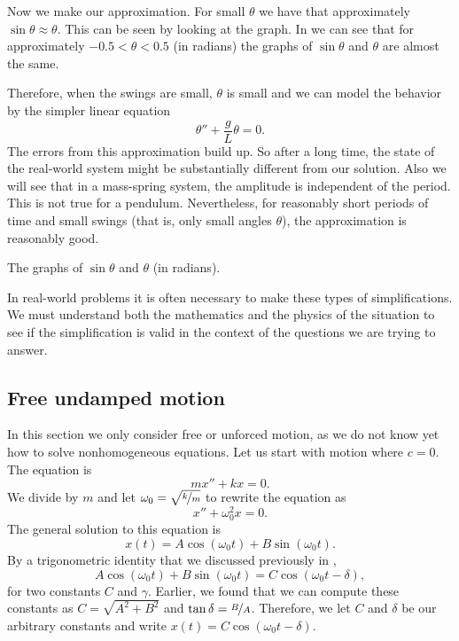 Now we make our approximation.  For small $\theta$ we have that approximately
$\sin \theta \approx \theta$.  This can be seen by looking at the graph.
In  we can see that for approximately
$-0.5 < \theta < 0.5$ (in radians) the graphs of $\sin \theta$ and $\theta$ are almost the
same.

Therefore, when the swings are small, $\theta$ is small and we can
model the behavior by the simpler linear equation
\begin{equation*}
\theta'' + \frac{g}{L} \theta = 0 .
\end{equation*}
The errors from this approximation build up.
So after a
long time, the state of the real-world system might be substantially
different from our solution.  Also we will
see that in a mass-spring system, the amplitude is independent of the
period.
This is not true for a pendulum.  Nevertheless, for reasonably short periods of time
and small swings (that is, only small angles $\theta$),
the approximation is reasonably good.

\begin{mywrapfig}{3.1in}
\capstart
{}
\caption{The graphs of $\sin \theta$ and $\theta$ (in radians).\label{mv:sinthetafig}}
\end{mywrapfig}

In real-world problems it is often necessary to make these types of
simplifications.  We must understand both the mathematics and
the physics of the situation to see if the simplification is valid in the
context of the questions we are trying to answer.

\subsection{Free undamped motion}

In this section we only consider free or unforced motion,
as we do not know yet how to solve nonhomogeneous equations.  Let us start with
 motion where $c=0$.  The equation is
\begin{equation*}
mx'' + kx = 0 .
\end{equation*}
We divide by $m$ and let $\omega_0 = \sqrt{\nicefrac{k}{m}}$ to rewrite the equation as
\begin{equation*}
x'' + \omega_0^2 x = 0 .
\end{equation*}
The general solution to this equation is
\begin{equation*}
x(t) = A \cos (\omega_0 t) + B \sin (\omega_0 t) .
\end{equation*}
By a trigonometric identity that we discussed previously in ,
\begin{equation*}
A \cos (\omega_0 t) + B \sin (\omega_0 t) =
C \cos ( \omega_0 t - \delta ) ,
\end{equation*}
for two constants $C$ and $\gamma$.
Earlier, we found that we can compute these constants as $C= \sqrt{A^2 + B^2}$ and $\tan \delta =
\nicefrac{B}{A}$.  Therefore, we let
$C$ and $\delta$ be our arbitrary constants and write
$x(t) = C \cos ( \omega_0 t - \delta )$.

